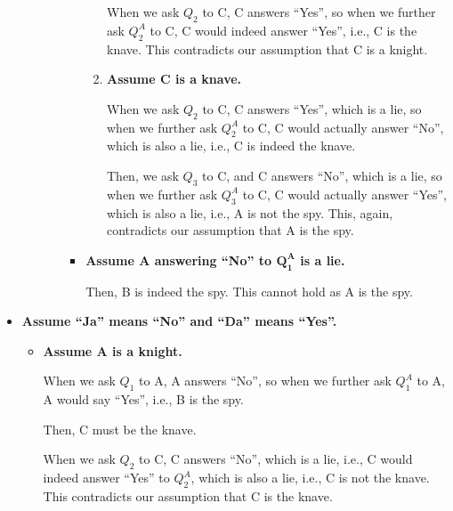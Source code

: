 \documentclass[answers]{exam}
\begin{document}
\begin{questions}
\begin{solution}
\begin{itemize}
\begin{itemize}
\begin{itemize}
\begin{itemize}
\begin{enumerate}
                            When we ask $Q_2$ to C, C answers ``Yes'', so when we further
                            ask $Q^A_2$ to C, C would indeed answer ``Yes'', i.e., C is the
                            knave. This contradicts our assumption that C is a knight.

                            \item \textbf{Assume C is a knave.}
                            
                            When we ask $Q_2$ to C, C answers ``Yes'', which is a lie,
                            so when we further ask $Q^A_2$ to C, C would actually answer
                            ``No'', which is also a lie, i.e., C is indeed the knave.

                            Then, we ask $Q_3$ to C, and C answers ``No'', which is a lie,
                            so when we further ask $Q^A_3$ to C, C would actually answer
                            ``Yes'', which is also a lie, i.e., A is not the spy. This,
                            again, contradicts our assumption that A is the spy.
                        \end{enumerate}

                        \item \textbf{Assume A answering ``No'' to $\bm{Q^A_1}$ is a lie.}
                        
                        Then, B is indeed the spy. This cannot hold as A is the spy.
                    \end{itemize}
                \end{itemize}
            \end{itemize}

            \item \textbf{Assume ``Ja'' means ``No'' and ``Da'' means ``Yes''.}
            
            \begin{itemize}
                \item \textbf{Assume A is a knight.}
                
                When we ask $Q_1$ to A, A answers ``No'', so when we further ask $Q^A_1$ to
                A, A would say ``Yes'', i.e., B is the spy.
                
                Then, C must be the knave.

                When we ask $Q_2$ to C, C answers ``No'', which is a lie, i.e., C would 
                indeed answer ``Yes'' to $Q^A_2$, which is also a lie, i.e., C is not the
                knave. This contradicts our assumption that C is the knave.


\end{itemize}
\end{itemize}
\end{solution}
\end{questions}
\end{document}
